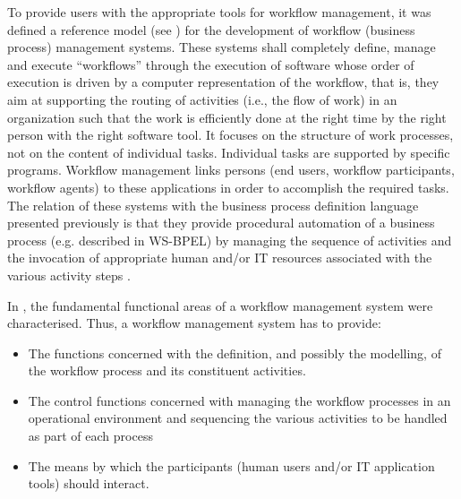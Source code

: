 To provide users with the appropriate tools for workflow management, 
it was defined a reference model (see \cite{hollingsworth95}) for the development of workflow (business process) management systems. 
These systems shall completely define, manage and execute ``workflows'' through the execution of software
whose order of execution is driven by a computer representation of the workflow, that is, 
they aim at supporting the routing of activities (i.e., the flow of work) in an organization such
that the work is efficiently done at the right time by the right person with the right
software tool. It focuses on the structure of work processes, not on the content of 
individual tasks. Individual tasks are supported by specific programs.
Workflow management links persons (end users, workflow participants, workflow
agents) to these applications in order to accomplish the required tasks. The relation of these systems with the business process
definition language presented previously is that they provide procedural automation of a business process (e.g. described in WS-BPEL) by
managing the sequence of activities and the invocation of appropriate human and/or IT resources
associated with the various activity steps \cite{hollingsworth95}. 

In \cite{hollingsworth95}, the fundamental functional areas of a workflow management system were characterised. Thus, a workflow 
management system has to provide:

\begin{itemize}
\item The functions concerned with the definition, and possibly the modelling, of the workflow process and its
constituent activities.

\item The control functions concerned with managing the workflow processes in an operational
environment and sequencing the various activities to be handled as part of each process

\item The means by which the participants (human users and/or IT application tools) should interact.

\end{itemize}



